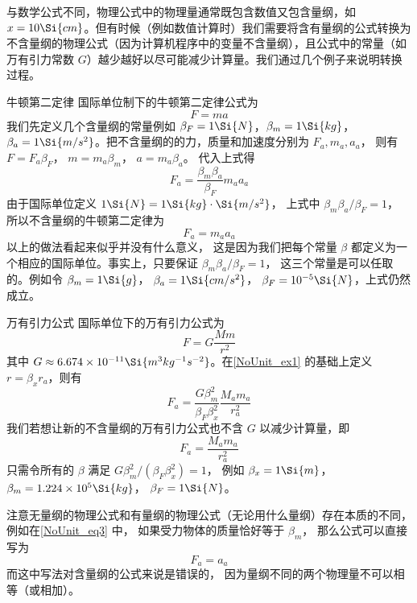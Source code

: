 
与数学公式不同，物理公式中的物理量通常既包含数值又包含量纲，如 $x = 10\Si{cm}$。但有时候（例如数值计算时）我们需要将含有量纲的公式转换为不含量纲的物理公式（因为计算机程序中的变量不含量纲），且公式中的常量（如万有引力常数 $G$）越少越好以尽可能减少计算量。我们通过几个例子来说明转换过程。

\begin{exam}{牛顿第二定律}\label{NoUnit_ex1}
国际单位制下的牛顿第二定律公式为
\begin{equation}
F = ma
\end{equation}
我们先定义几个含量纲的常量例如 $\beta_{F} = 1\Si{N}$，$\beta_{m} = 1\Si{kg}$，$\beta_{a} = 1\Si{m/s^2}$。把不含量纲的的力，质量和加速度分别为 $F_a, m_a, a_a$， 则有 $F = F_a \beta_F$， $m = m_a \beta_{m}$， $a = m_a \beta_{a}$。 代入上式得
\begin{equation}
F_a = \frac{\beta_m \beta_a}{\beta_F} m_a  a_a
\end{equation}
由于国际单位定义 $1\Si{N} = 1\Si{kg}\cdot\Si{m/s^2}$， 上式中 $\beta_m \beta_a/\beta_F = 1$， 所以不含量纲的牛顿第二定律为
\begin{equation}\label{NoUnit_eq3}
F_a = m_a a_a
\end{equation}
以上的做法看起来似乎并没有什么意义， 这是因为我们把每个常量 $\beta$ 都定义为一个相应的国际单位。事实上，只要保证 $\beta_m \beta_a/\beta_F = 1$， 这三个常量是可以任取的。例如令 $\beta_m = 1\Si{g}$， $\beta_a = 1\Si{cm/s^2}$， $\beta_F = 10^{-5}\Si{N}$，上式仍然成立。
\end{exam}

\begin{exam}{万有引力公式}
国际单位下的万有引力公式为
\begin{equation}
F = G\frac{Mm}{r^2}
\end{equation}
其中 $G \approx 6.674\times 10^{-11} \Si{m^3 kg^{-1} s^{-2}}$。在\autoref{NoUnit_ex1} 的基础上定义 $r = \beta_x r_a$，则有
\begin{equation}
F_a = \frac{G\beta_m^2}{\beta_F \beta_x^2} \frac{M_a m_a}{r_a^2}
\end{equation}
我们若想让新的不含量纲的万有引力公式也不含 $G$ 以减少计算量，即
\begin{equation}\label{NoUnit_eq6}
F_a = \frac{M_a m_a}{r_a^2}
\end{equation}
只需令所有的 $\beta$ 满足 $G\beta_m^2/(\beta_F\beta_x^2) = 1$， 例如 $\beta_x = 1\Si{m}$， $\beta_m = 1.224\times 10^5 \Si{kg}$， $\beta_F = 1\Si{N}$。
\end{exam}

注意无量纲的物理公式和有量纲的物理公式（无论用什么量纲）存在本质的不同， 例如在\autoref{NoUnit_eq3} 中， 如果受力物体的质量恰好等于 $\beta_m$， 那么公式可以直接写为
\begin{equation}\label{NoUnit_eq7}
F_a = a_a
\end{equation}
而这中写法对含量纲的公式来说是错误的， 因为量纲不同的两个物理量不可以相等（或相加）。

